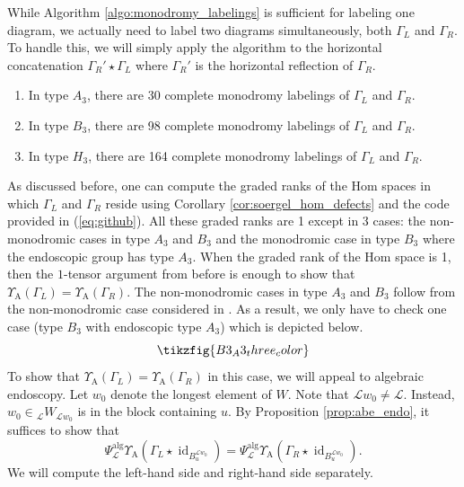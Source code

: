\documentclass{amsart}
\newcommand{\scrL}{\mathcal{L}}
\DeclareMathOperator{\id}{id}
\DeclareMathOperator{\alg}{alg}
\DeclareMathOperator{\Abe}{A}
\newcommand{\W}[2]{{}_{#1}W_{#2}}
\theoremstyle{definition}
\numberwithin{equation}{subsection}
\begin{document}
While Algorithm \ref{algo:monodromy_labelings} is sufficient for labeling one diagram, we actually need to label two diagrams simultaneously, both $\Gamma_L$ and $\Gamma_R$.
To handle this, we will simply apply the algorithm to the horizontal concatenation $\Gamma_{R}' \star \Gamma_{L}$ where $\Gamma_{R}'$ is the horizontal reflection of $\Gamma_{R}$. 
\begin{enumerate}
    \item In type $A_3$, there are 30 complete monodromy labelings of $\Gamma_L$ and $\Gamma_R$.
    \item In type $B_3$, there are 98 complete monodromy labelings of $\Gamma_L$ and $\Gamma_R$.
    \item In type $H_3$, there are 164 complete monodromy labelings of $\Gamma_L$ and $\Gamma_R$. 
\end{enumerate}
As discussed before, one can compute the graded ranks of the Hom spaces in which $\Gamma_L$ and $\Gamma_R$ reside using Corollary \ref{cor:soergel_hom_defects} and the code provided in (\ref{eq:github}). 
All these graded ranks are 1 except in 3 cases: the non-monodromic cases in type $A_3$ and $B_3$ and the monodromic case in type $B_3$ where the endoscopic group has type $A_3$. When the graded rank of the Hom space is 1, then the $1$-tensor argument from before is enough to show that $\Upsilon_{\Abe} (\Gamma_L) = \Upsilon_{\Abe} (\Gamma_R)$. 
The non-monodromic cases in type $A_3$ and $B_3$ follow from the non-monodromic case considered in \cite{EW}.
As a result, we only have to check one case (type $B_3$ with endoscopic type $A_3$) which is depicted below.
\begin{equation}\label{eq:B3_A3_1}
    \tikzfig{B3_A3_three_color}
\end{equation}
To show that $\Upsilon_{\Abe} (\Gamma_L) = \Upsilon_{\Abe} (\Gamma_R)$ in this case, we will appeal to algebraic endoscopy. Let $w_0$ denote the longest element of $W$.
Note that $\scrL w_0 \neq \scrL$. Instead, $w_0 \in \W{\scrL}{\scrL w_0}$ is in the block containing $u$. 
By Proposition \ref{prop:abe_endo}, it suffices to show that
\[\Psi_{\scrL}^{\alg} \Upsilon_{\Abe} (\Gamma_L \star \id_{B_u^{\scrL w_0}}) = \Psi_{\scrL}^{\alg} \Upsilon_{\Abe} (\Gamma_R \star \id_{B_u^{\scrL w_0}}).\]
We will compute the left-hand side and right-hand side separately.
\end{document}
